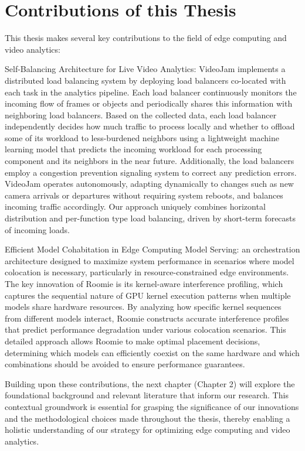 \section{Contributions of this Thesis}

This thesis makes several key contributions to the field of edge computing and video analytics:

Self-Balancing Architecture for Live Video Analytics: VideoJam implements a distributed load balancing system by deploying load balancers co-located with each task in the analytics pipeline. Each load balancer continuously monitors the incoming flow of frames or objects and periodically shares this information with neighboring load balancers. Based on the collected data, each load balancer independently decides how much traffic to process locally and whether to offload some of its workload to less-burdened neighbors using a lightweight machine learning model that predicts the incoming workload for each processing component and its neighbors in the near future. Additionally, the load balancers employ a congestion prevention signaling system to correct any prediction errors. VideoJam operates autonomously, adapting dynamically to changes such as new camera arrivals or departures without requiring system reboots, and balances incoming traffic accordingly. Our approach uniquely combines horizontal distribution and per-function type load balancing, driven by short-term forecasts of incoming loads.

Efficient Model Cohabitation in Edge Computing Model Serving: an orchestration architecture designed to maximize system performance in scenarios where model colocation is necessary, particularly in resource-constrained edge environments. The key innovation of Roomie is its kernel-aware interference profiling, which captures the sequential nature of GPU kernel execution patterns when multiple models share hardware resources. By analyzing how specific kernel sequences from different models interact, Roomie constructs accurate interference profiles that predict performance degradation under various colocation scenarios. This detailed approach allows Roomie to make optimal placement decisions, determining which models can efficiently coexist on the same hardware and which combinations should be avoided to ensure performance guarantees.

Building upon these contributions, the next chapter (Chapter 2) will explore the foundational background and relevant literature that inform our research. This contextual groundwork is essential for grasping the significance of our innovations and the methodological choices made throughout the thesis, thereby enabling a holistic understanding of our strategy for optimizing edge computing and video analytics.